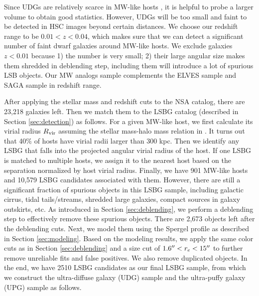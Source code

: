 \documentclass[twocolumn,astrosymb,twocolappendix]{aastex631}
\begin{document}
\begin{CJK*}{UTF8}{gbsn}
Since UDGs are relatively scarce in MW-like hosts \citep{SAGA-II,CarlstenELVES2022}, it is helpful to probe a larger volume to obtain good statistics. However, UDGs will be too small and faint to be detected in HSC images beyond certain distances. We choose our redshift range to be $0.01 < z < 0.04$, which makes sure that we can detect a significant number of faint dwarf galaxies around MW-like hosts. We exclude galaxies $z<0.01$ because 1) the number is very small; 2) their large angular size makes them shredded in deblending step, including them will introduce a lot of spurious LSB objects. Our MW analogs sample complements the ELVES sample and SAGA sample in redshift range. 

After applying the stellar mass and redshift cuts to the NSA catalog, there are 23,218 galaxies left. Then we match them to the LSBG catalog (described in Section \ref{sec:detection}) as follows. For a given MW-like host, we first calculate its virial radius $R_{\rm vir}$ assuming the stellar mass-halo mass relation in \citet{Behroozi2010}. It turns out that 40\% of hosts have virial radii larger than 300 kpc. Then we identify any LSBG that falls into the projected angular virial radius of the host. If one LSBG is matched to multiple hosts, we assign it to the nearest host based on the separation normalized by host virial radius. Finally, we have 901 MW-like hosts and 10,579 LSBG candidates associated with them. However, there are still a significant fraction of spurious objects in this LSBG sample, including galactic cirrus, tidal tails/streams, shredded large galaxies, compact sources in galaxy outskirts, etc. As introduced in Section \ref{sec:deblending}, we perform a deblending step to effectively remove these spurious objects. There are 2,673 objects left after the deblending cuts. Next, we model them using the Spergel profile as described in Section \ref{sec:modeling}. Based on the modeling results, we apply the same color cuts as in Section \ref{sec:deblending} and a size cut of $1.6\mbox{$^{\prime\prime}$} < r_e < 15\mbox{$^{\prime\prime}$}$ to further remove unreliable fits and false positives. We also remove duplicated objects. In the end, we have 2510 LSBG candidates as our final LSBG sample, from which we construct the ultra-diffuse galaxy (UDG) sample and the ultra-puffy galaxy (UPG) sample as follows. 


\end{CJK*}
\end{document}
